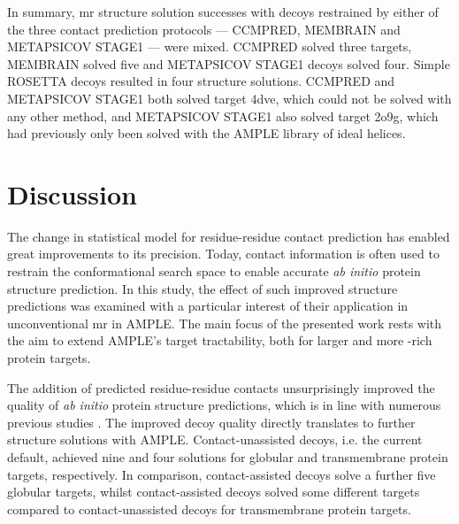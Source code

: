 In summary, \gls{mr} structure solution successes with decoys restrained by either of the three contact prediction protocols --- CCMPRED, MEMBRAIN and METAPSICOV STAGE1 --- were mixed. CCMPRED solved three targets, MEMBRAIN solved
five and METAPSICOV STAGE1 decoys solved four. Simple ROSETTA decoys resulted in four structure solutions. CCMPRED and METAPSICOV STAGE1 both solved target 4dve, which could not be solved with any other method, and METAPSICOV STAGE1 also solved target 2o9g, which had previously only been solved with the AMPLE library of ideal helices.

\section{Discussion}
The change in statistical model for residue-residue contact prediction has enabled great improvements to its precision. Today, contact information is often used to restrain the conformational search space to enable accurate \textit{ab initio} protein structure prediction. In this study, the effect of such improved structure predictions was examined with a particular interest of their application in unconventional \gls{mr} in AMPLE. The main focus of the presented work rests with the aim to extend AMPLE's target tractability, both for larger and more \textbeta-rich protein targets.

The addition of predicted residue-residue contacts unsurprisingly improved the quality of \textit{ab initio} protein structure predictions, which is in line with numerous previous studies \cite[e.g.,][]{Marks2011-os,Michel2014-eg,Kosciolek2014-bt,Ovchinnikov2015-tn,Ovchinnikov2016-jj,Michel2017-xh,De_Oliveira2017-sg,Ovchinnikov2017-nd,Wang2017-rx}. The improved decoy quality directly translates to further structure solutions with AMPLE. Contact-unassisted decoys, i.e. the current default, achieved nine and four solutions for globular and transmembrane protein targets, respectively. In comparison, contact-assisted decoys solve a further five globular targets, whilst contact-assisted decoys solved some different targets compared to contact-unassisted decoys for transmembrane protein targets.

